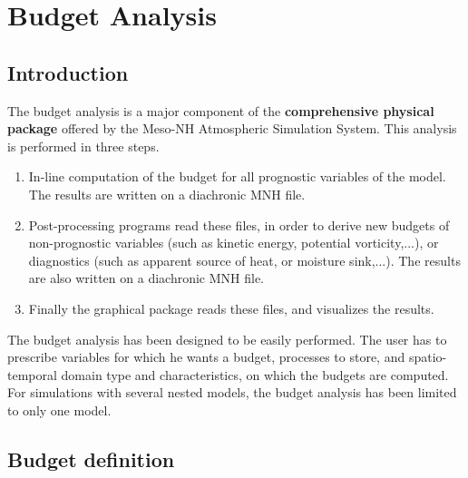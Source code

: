 
\chapter{Budget Analysis}
\minitoc


\section{Introduction}

The budget analysis is a major component of the {\bf comprehensive
physical package} offered by the Meso-NH Atmospheric Simulation System. This
analysis is performed in three steps.

\begin{enumerate}
\item In-line computation of the budget for all prognostic variables of the
model. The results are written on a diachronic MNH file.
\item Post-processing programs read these files, in order
to derive new budgets of non-prognostic variables (such as kinetic energy,
potential vorticity,...), or diagnostics (such as apparent source of heat, or
moisture sink,...). The results are also written on a diachronic MNH file.
\item Finally the graphical package reads these files, and visualizes
the results.
\end{enumerate}

 The budget analysis has been designed to be easily performed. The user has to
prescribe variables for which he wants a budget, processes
to store, and spatio-temporal domain type and characteristics,
on which the budgets are computed. For simulations with several nested models,
the budget analysis has been limited to only one model.

\section{Budget definition}

